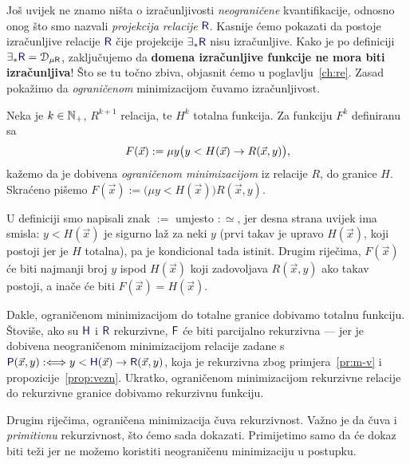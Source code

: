 Još uvijek ne znamo ništa o izračunljivosti \emph{neograničene} kvantifikacije, odnosno onog što smo nazvali \emph{projekcija relacije} $\f R$. Kasnije ćemo pokazati da postoje izračunljive relacije $\f R$ čije projekcije $\exists_*\f R$ nisu izračunljive. Kako je po definiciji $\exists_*\f R=\dom{\mu\f R}$, zaključujemo da \textbf{domena izračunljive funkcije ne mora biti izračunljiva}! Što se tu točno zbiva, objasnit ćemo u poglavlju~\ref{ch:re}. Zasad pokažimo da \emph{ograničenom} minimizacijom čuvamo izračunljivost.


\begin{definicija}
Neka je $k\in{\mathbb N}_+$, $R^{k+1}$ relacija, te $H^k$ totalna funkcija. Za funkciju $F^k$ definiranu sa
\begin{equation}
    F(\vec x):=\mu y\bigl(y<H(\vec x)\to R(\vec x,y)\bigr)\text,
\end{equation}
kažemo da je dobivena \emph{ograničenom minimizacijom} iz relacije $R$, do granice $H$. Skraćeno pišemo $F(\vec x):=\bigl(\mu y<H(\vec x)\bigr)R(\vec x,y)$.
\end{definicija}

\begin{napomena}\label{nap:min=H}
U definiciji smo napisali znak $:=$ umjesto $:\simeq$, jer desna strana uvijek ima smisla: $y<H(\vec x)$ je sigurno laž za neki $y$ (prvi takav je upravo $H(\vec x)$, koji postoji jer je $H$ totalna), pa je kondicional tada istinit. Drugim riječima, $F(\vec x)$ će biti najmanji broj $y$ ispod $H(\vec x)$ koji zadovoljava $R(\vec x,y)$ ako takav postoji, a inače će biti $F(\vec x)=H(\vec x)$.

Dakle, ograničenom minimizacijom do totalne granice dobivamo totalnu funkciju. Štoviše, ako su $\f H$ i $\f R$ rekurzivne, $\f F$ će biti parcijalno rekurzivna --- jer je dobivena neograničenom minimizacijom relacije zadane s $\f P(\vec x,y):\Longleftrightarrow y<\f H(\vec x)\to\f R(\vec x,y)$, koja je rekurzivna zbog primjera~\ref{pr:m-v} i propozicije~\ref{prop:vezn}. Ukratko, ograničenom minimizacijom rekurzivne relacije do rekurzivne granice
dobivamo rekurzivnu funkciju.
\end{napomena}

Drugim riječima, ograničena minimizacija čuva rekurzivnost. Važno je da čuva i \emph{primitivnu} rekurzivnost, što ćemo sada dokazati. Primijetimo samo da će dokaz biti teži jer ne možemo koristiti neograničenu minimizaciju u postupku.

